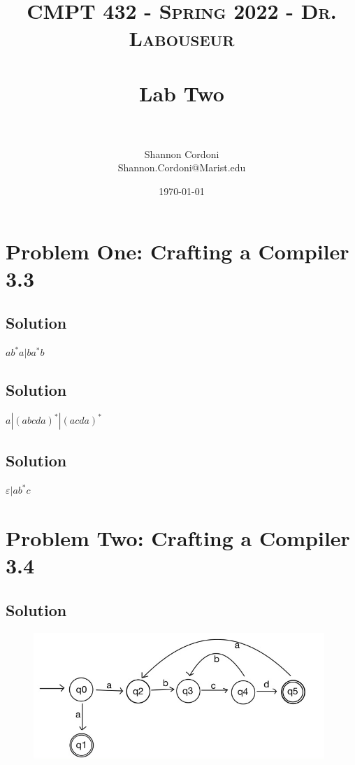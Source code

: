 \documentclass[letterpaper, 10pt,DIV=13]{scrartcl}
\title{	
   \normalfont \normalsize 
   \textsc{CMPT 432 - Spring 2022 - Dr. Labouseur} \\[10pt] %
   \horrule{0.5pt} \\[0.25cm] 	%
   \huge Lab Two  \\     	    %
   \horrule{0.5pt} \\[0.25cm] 	%
}
\author{Shannon Cordoni \\ \normalsize Shannon.Cordoni@Marist.edu}
\date{\normalsize\today} 	%
\numberwithin{equation}{section} %
\numberwithin{figure}{section} %
\numberwithin{table}{section} %
\begin{document}
\maketitle %

\section{Problem One: Crafting a Compiler 3.3}

\subsection{Solution}
$ab^*a|ba^*b$

\subsection{Solution}
$a|(abcda)^*|(acda)^*$


\subsection{Solution}

$\varepsilon|ab^*c$


\newpage
\section{Problem Two: Crafting a Compiler 3.4}

\subsection{Solution}

\begin{figure}[ht]
  \centering
  \includegraphics[width=11cm]{IMG_0041.png}
  \label{figure:dfa1.png}
\end{figure}
\end{document}
